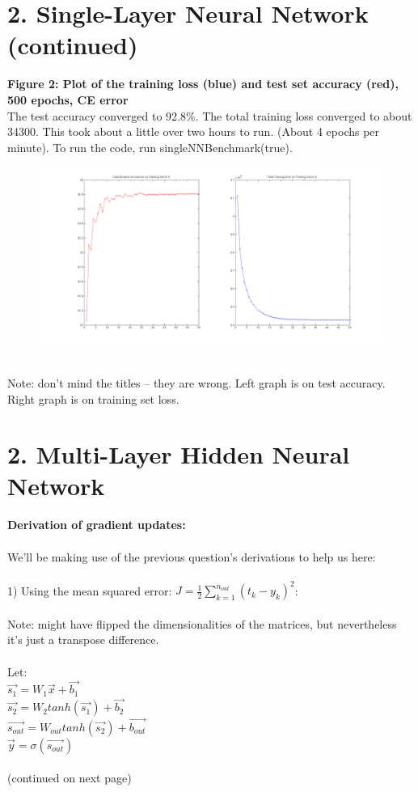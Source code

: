 \documentclass[11pt]{article}
\begin{document}
\section*{2. Single-Layer Neural Network (continued)}
\textbf{Figure 2: Plot of the training loss (blue) and test set accuracy (red), 500 epochs, CE error} \\
The test accuracy converged to 92.8\%. The total training loss converged to about 34300. This took about a little over two hours to run. (About 4 epochs per minute). To run the code, run singleNNBenchmark(true).
\\
\begin{figure}[ht!]
\centering
\includegraphics[width=180mm]{plots/finalp1ce.png}
\label{overflow}
\end{figure}
\\
Note: don't mind the titles -- they are wrong. Left graph is on test accuracy. Right graph is on training set loss.

\section*{2. Multi-Layer Hidden Neural Network}
\textbf{ Derivation of gradient updates:}
\\\\
We'll be making use of the previous question's derivations to help us here:
\\\\
1) Using the mean squared error: $J = \frac{1}{2} \sum_{k=1}^{n_{out}} (t_k - y_k)^2 $:
\\\\
Note: might have flipped the dimensionalities of the matrices, but nevertheless it's just a transpose difference.
\\\\
Let: \\
$ \vec{s_1} = W_1 \vec{x} + \vec{b_1} $ \\
$ \vec{s_2} = W_2 tanh(\vec{s_1}) + \vec{b_2} $ \\
$ \vec{s_{out}} = W_{out} tanh ( \vec{s_2}) + \vec{b_{out}} $ \\
$ \vec{y} = \sigma (\vec{s_{out}}) $
\\\\
(continued on next page)
\newpage
\end{document}
